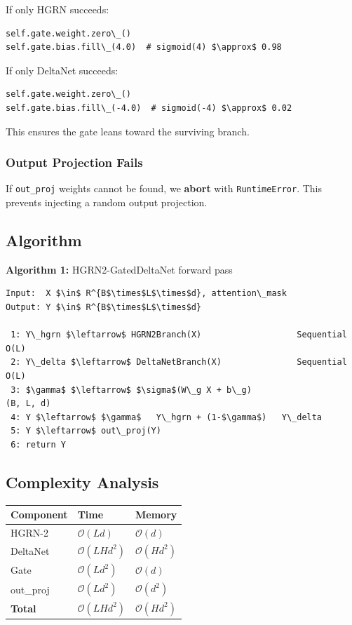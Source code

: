If only HGRN succeeds:
\begin{lstlisting}
self.gate.weight.zero\_()
self.gate.bias.fill\_(4.0)  # sigmoid(4) $\approx$ 0.98
\end{lstlisting}

If only DeltaNet succeeds:
\begin{lstlisting}
self.gate.weight.zero\_()
self.gate.bias.fill\_(-4.0)  # sigmoid(-4) $\approx$ 0.02
\end{lstlisting}

This ensures the gate leans toward the surviving branch.

\subsubsection{Output Projection Fails}

If \texttt{out\_proj} weights cannot be found, we \textbf{abort} with \texttt{RuntimeError}. 
This prevents injecting a random output projection.

\subsection{Algorithm}

\textbf{Algorithm 1:} HGRN2-GatedDeltaNet forward pass
\begin{lstlisting}
Input:  X $\in$ R^{B$\times$L$\times$d}, attention\_mask
Output: Y $\in$ R^{B$\times$L$\times$d}

 1: Y\_hgrn $\leftarrow$ HGRN2Branch(X)                   Sequential O(L)
 2: Y\_delta $\leftarrow$ DeltaNetBranch(X)               Sequential O(L)
 3: $\gamma$ $\leftarrow$ $\sigma$(W\_g X + b\_g)                        (B, L, d)
 4: Y $\leftarrow$ $\gamma$   Y\_hgrn + (1-$\gamma$)   Y\_delta
 5: Y $\leftarrow$ out\_proj(Y)
 6: return Y
\end{lstlisting}

\subsection{Complexity Analysis}

\begin{table}[H]
\centering
\small
\begin{tabular}{lll}
\toprule
\textbf{Component} & \textbf{Time} & \textbf{Memory} \\
\midrule
HGRN-2 & $\mathcal{O}(L d)$ & $\mathcal{O}(d)$ \\
DeltaNet & $\mathcal{O}(L H d^2)$ & $\mathcal{O}(H d^2)$ \\
Gate & $\mathcal{O}(L d^2)$ & $\mathcal{O}(d)$ \\
out\_proj & $\mathcal{O}(L d^2)$ & $\mathcal{O}(d^2)$ \\
\textbf{Total} & $\mathcal{O}(L H d^2)$ & $\mathcal{O}(H d^2)$ \\
\bottomrule
\end{tabular}
\end{table}

